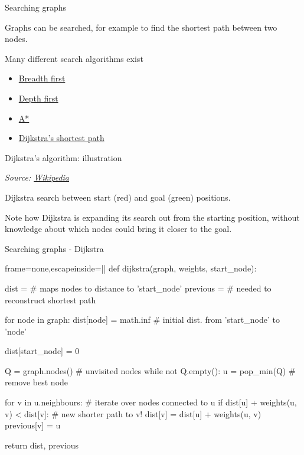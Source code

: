 \documentclass[compress,xcolor=table]{beamer}
\newcommand{\source}[2]{{\tiny\it Source: \href{#1}{#2}}}
\begin{document}
\begin{frame}{Searching graphs}

Graphs can be searched, for example to find the shortest path between
two nodes.

Many different search algorithms exist

\begin{itemize}
\item \href{http://en.wikipedia.org/wiki/Breadth-first_search}{Breadth
  first}
\item \href{http://en.wikipedia.org/wiki/Depth-first_search}{Depth first}
\item \href{http://en.wikipedia.org/wiki/A*_search_algorithm}{A*}
\item \href{http://en.wikipedia.org/wiki/Dijkstra's_algorithm}{Dijkstra's
  shortest path}
\end{itemize}

\end{frame}

\begin{frame}{Dijkstra's algorithm: illustration}

    \begin{center}

        \source{http://en.wikipedia.org/wiki/Dijkstra's_algorithm}{Wikipedia}
    \end{center}

    Dijkstra search between start (red) and goal (green)
    positions.

    Note how Dijkstra is expanding its search out from the
    starting position, without knowledge about which nodes could bring it
    closer to the goal.

\end{frame}

\begin{frame}[fragile]{Searching graphs - Dijkstra}

\begin{pythoncode*}{frame=none,escapeinside=||}
def dijkstra(graph, weights, start_node):

  dist = {} # maps nodes to distance to 'start_node'
  previous = {} # needed to reconstruct shortest path

  for node in graph:
    dist[node] = math.inf # initial dist. from 'start_node' to 'node'

  dist[start_node] = 0

  Q = graph.nodes() # unvisited nodes
  while not Q.empty():
    u = pop_min(Q) # remove best node

    for v in u.neighbours: # iterate over nodes connected to u
      if dist[u] + weights(u, v) < dist[v]: # new shorter path to v!
        dist[v] = dist[u] + weights(u, v)
        previous[v] = u

  return dist, previous
\end{pythoncode*}
\end{frame}
\end{document}
